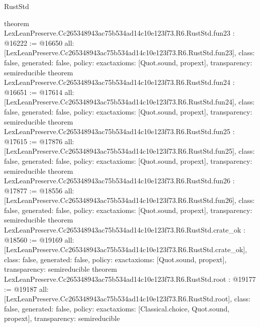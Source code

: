 \begin{lexlean}{RustStd}
\begin{coremodule}
{}
theorem LexLeanPreserve.Cc265348943ac75b534ad14c10e123f73.R6.RustStd.fun23 : @16222 := @16650 {
  all: [LexLeanPreserve.Cc265348943ac75b534ad14c10e123f73.R6.RustStd.fun23],
  class: false,
  generated: false,
  policy: exact{axioms: [Quot.sound, propext]},
  transparency: semireducible
}
theorem LexLeanPreserve.Cc265348943ac75b534ad14c10e123f73.R6.RustStd.fun24 : @16651 := @17614 {
  all: [LexLeanPreserve.Cc265348943ac75b534ad14c10e123f73.R6.RustStd.fun24],
  class: false,
  generated: false,
  policy: exact{axioms: [Quot.sound, propext]},
  transparency: semireducible
}
theorem LexLeanPreserve.Cc265348943ac75b534ad14c10e123f73.R6.RustStd.fun25 : @17615 := @17876 {
  all: [LexLeanPreserve.Cc265348943ac75b534ad14c10e123f73.R6.RustStd.fun25],
  class: false,
  generated: false,
  policy: exact{axioms: [Quot.sound, propext]},
  transparency: semireducible
}
theorem LexLeanPreserve.Cc265348943ac75b534ad14c10e123f73.R6.RustStd.fun26 : @17877 := @18556 {
  all: [LexLeanPreserve.Cc265348943ac75b534ad14c10e123f73.R6.RustStd.fun26],
  class: false,
  generated: false,
  policy: exact{axioms: [Quot.sound, propext]},
  transparency: semireducible
}
theorem LexLeanPreserve.Cc265348943ac75b534ad14c10e123f73.R6.RustStd.crate_ok : @18560 := @19169 {
  all: [LexLeanPreserve.Cc265348943ac75b534ad14c10e123f73.R6.RustStd.crate_ok],
  class: false,
  generated: false,
  policy: exact{axioms: [Quot.sound, propext]},
  transparency: semireducible
}
theorem LexLeanPreserve.Cc265348943ac75b534ad14c10e123f73.R6.RustStd.root : @19177 := @19187 {
  all: [LexLeanPreserve.Cc265348943ac75b534ad14c10e123f73.R6.RustStd.root],
  class: false,
  generated: false,
  policy: exact{axioms: [Classical.choice, Quot.sound, propext]},
  transparency: semireducible
}


\end{coremodule}
\end{lexlean}
